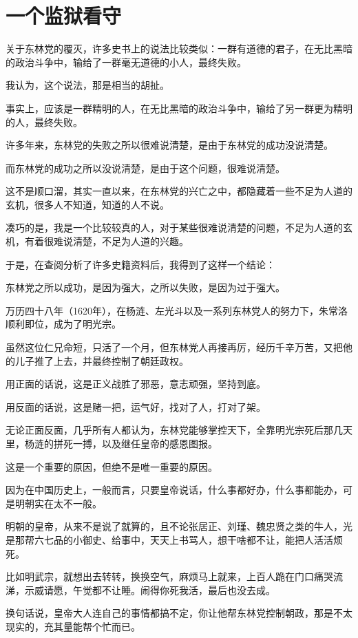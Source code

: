 \section{一个监狱看守}
\ifnum{}
	\begin{multicols}{\theparacolNo}
\fi
关于东林党的覆灭，许多史书上的说法比较类似：一群有道德的君子，在无比黑暗的政治斗争中，输给了一群毫无道德的小人，最终失败。

我认为，这个说法，那是相当的胡扯。

事实上，应该是一群精明的人，在无比黑暗的政治斗争中，输给了另一群更为精明的人，最终失败。

许多年来，东林党的失败之所以很难说清楚，是由于东林党的成功没说清楚。

而东林党的成功之所以没说清楚，是由于这个问题，很难说清楚。

这不是顺口溜，其实一直以来，在东林党的兴亡之中，都隐藏着一些不足为人道的玄机，很多人不知道，知道的人不说。

凑巧的是，我是一个比较较真的人，对于某些很难说清楚的问题，不足为人道的玄机，有着很难说清楚，不足为人道的兴趣。

于是，在查阅分析了许多史籍资料后，我得到了这样一个结论：

东林党之所以成功，是因为强大，之所以失败，是因为过于强大。

万历四十八年（1620年），在杨涟、左光斗以及一系列东林党人的努力下，朱常洛顺利即位，成为了明光宗。

虽然这位仁兄命短，只活了一个月，但东林党人再接再厉，经历千辛万苦，又把他的儿子推了上去，并最终控制了朝廷政权。

用正面的话说，这是正义战胜了邪恶，意志顽强，坚持到底。

用反面的话说，这是赌一把，运气好，找对了人，打对了架。

无论正面反面，几乎所有人都认为，东林党能够掌控天下，全靠明光宗死后那几天里，杨涟的拼死一搏，以及继任皇帝的感恩图报。

这是一个重要的原因，但绝不是唯一重要的原因。

因为在中国历史上，一般而言，只要皇帝说话，什么事都好办，什么事都能办，可是明朝实在太不一般。

明朝的皇帝，从来不是说了就算的，且不论张居正、刘瑾、魏忠贤之类的牛人，光是那帮六七品的小御史、给事中，天天上书骂人，想干啥都不让，能把人活活烦死。

比如明武宗，就想出去转转，换换空气，麻烦马上就来，上百人跪在门口痛哭流涕，示威请愿，午觉都不让睡。闹得你死我活，最后也没去成。

换句话说，皇帝大人连自己的事情都搞不定，你让他帮东林党控制朝政，那是不太现实的，充其量能帮个忙而已。


\end{multicols}
